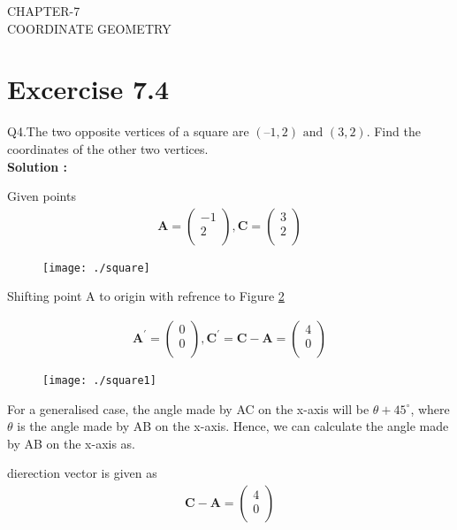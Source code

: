 \documentclass[12pt]{article}
\newcommand{\myvec}[1]{\ensuremath{\begin{pmatrix}#1\end{pmatrix}}}
\let\vec\mathbf
\begin{document}
\begin{center}
\textbf\large{CHAPTER-7 \\ COORDINATE GEOMETRY}

\end{center}
\section*{Excercise 7.4}

Q4.The two opposite vertices of a square are $(–1, 2) \text{ and } (3, 2)$. Find the coordinates of the other two vertices.\\
\textbf{Solution :}

Given points 
\begin{align}
\vec{A} = \myvec
{
-1 \\
 2\\
},
\vec{C} = 
\myvec
{
3\\
2\\
}
\end{align}

\begin{figure}[!h]
	\begin{center} 
	    \texttt{[image: ./square]}
	\end{center}
\caption{}
\label{fig:Fig1}
\end{figure}

Shifting point A to origin with refrence to Figure \ref{fig:Fig2}

\begin{align}
\vec{A^{\prime}} =
\myvec{
0 \\
0\\
},
\vec{C^{\prime}} = \vec{C}-\vec{A} = 
\myvec{
4 \\
0\\
}
\end{align}

\begin{figure}[!h]
	\begin{center} 
	    \texttt{[image: ./square1]}
	\end{center}
\caption{}
\label{fig:Fig2}
\end{figure}

\newpage

For a generalised case, the angle made by AC on the x-axis will be $\theta + 45^{\circ}$, where $\theta$ is the angle made by AB on the x-axis.
Hence, we can calculate the angle made by AB on the x-axis as.

dierection vector is given as
\begin{align}
\vec{C} - \vec{A} = \myvec{
4\\
0\\
}
\end{align}
\end{document}
